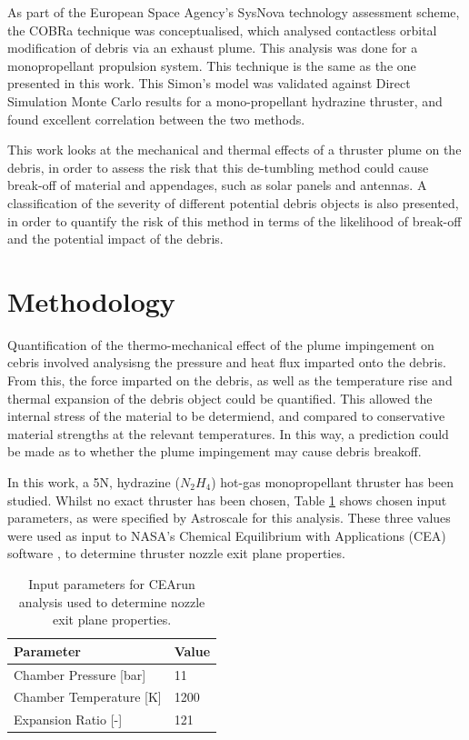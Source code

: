 \documentclass[journal]{new-aiaa}
\begin{document}
As part of the European Space Agency's SysNova technology assessment scheme, the COBRa technique was conceptualised, which analysed contactless orbital modification of debris via an exhaust plume. This analysis was done for a monopropellant propulsion system. This technique is the same as the one presented in this work. This Simon's model was validated against Direct Simulation Monte Carlo results for a mono-propellant hydrazine thruster, and found excellent correlation between the two methods.


This work looks at the mechanical and thermal effects of a thruster plume on the debris, in order to assess the risk that this de-tumbling method could cause break-off of material and appendages, such as solar panels and antennas. A classification of the severity of different potential debris objects is also presented, in order to quantify the risk of this method in terms of the likelihood of break-off and the potential impact of the debris.







\section{Methodology}
\label{sec-methodolody}

Quantification of the thermo-mechanical effect of the plume impingement on cebris involved analysisng the pressure and heat flux imparted onto the debris. From this, the force imparted on the debris, as well as the temperature rise and thermal expansion of the debris object could be quantified. This allowed the internal stress of the material to be determiend, and compared to conservative material strengths at the relevant temperatures. In this way, a prediction could be made as to whether the plume impingement may cause debris breakoff.

In this work, a 5N, hydrazine ($N_2 H_4$) hot-gas monopropellant thruster has been studied. Whilst no exact thruster has been chosen, Table \ref{method_table_ceaInputs} shows chosen input parameters, as were specified by Astroscale for this analysis. These three values were used as input to NASA's Chemical Equilibrium with Applications (CEA) software \cite{josephbanksChemicalEquilibriumApplications2023}, to determine thruster nozzle exit plane properties.

\begin{table}[h]
    \centering
    \caption{Input parameters for CEArun analysis used to determine nozzle exit plane properties.}
    \begin{tabular}{ll}
    \hline
    \hline
    Parameter & Value \\
    \hline
    Chamber Pressure [bar] & 11 \\
    Chamber Temperature [K] & 1200 \\
    Expansion Ratio [-] & 121 \\
    \hline
    \hline
    \end{tabular}
    \label{method_table_ceaInputs}
\end{table}
\end{document}
